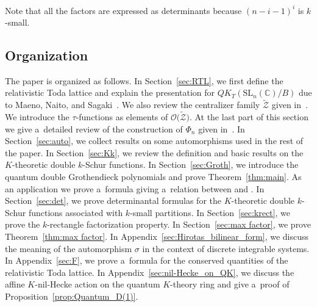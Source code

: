 \documentclass[pdftex]{sigma}
\numberwithin{equation}{section}
\newcommand{\C}{\mathbb{C}}
\newcommand{\la}{\lambda}
\newcommand{\SL}{\mathrm{SL}}
\theoremstyle{definition}
\begin{document}
Note that all the factors 
are expressed as determinants because $(n-i-1)^i$ is $k$-small.

\subsection{Organization}
The paper is organized as follows. In Section~\ref{sec:RTL}, we first define the relativistic Toda lattice and explain
the presentation for $QK_T(\SL_n(\C)/B)$ due to Maeno, Naito, and Sagaki~\cite{MNS1,MNS2}.
We also review the centralizer family $\tilde{\mathscr{Z}}$ given in~\cite{ISY}. We introduce the $\tau$-functions as elements of $\mathscr{O}\bigl(\tilde{\mathscr{Z}}\bigr)$.
At the last part of this section we give a~detailed review of the construction of $\Phi_n$ given in~\cite{IIM}. In Section~\ref{sec:auto}, we collect results on some automorphisms used in the rest of the paper.
In Section~\ref{sec:Kk}, we review the definition and basic results on the $K$-theoretic double $k$-Schur functions.
In Section~\ref{sec:Groth}, we introduce the quantum double Grothendieck polynomials and prove Theorem~\ref{thm:main}.
As an application we prove a~formula giving a~relation between \smash{$g_\la^{(k)}(y|b)$} and \smash{$\tilde{g}_\la^{(k)}(y|b)$}.
In Section~\ref{sec:det}, we prove determinantal formulas for the $K$-theoretic double $k$-Schur functions
associated with $k$-small partitions.
In Section~\ref{sec:krect}, we prove the $k$-rectangle factorization property.
In Section~\ref{sec:max factor}, we prove Theorem~\ref{thm:max factor}.
In Appendix~\ref{sec:Hirotas_bilinear_form}, we discuss the meaning of the automorphism $\sigma$
in the context of discrete integrable systems.
In Appendix~\ref{sec:F}, we prove a~formula for the conserved quantities of the relativistic Toda lattice.
In Appendix~\ref{sec:nil-Hecke_on_QK}, we discuss the affine $K$-nil-Hecke action on the quantum $K$-theory ring and give a~proof of Proposition~\ref{prop:Quantum_D(1)}.
\end{document}
